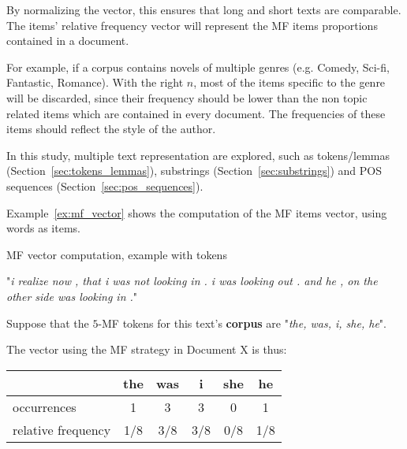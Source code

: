 By normalizing the vector, this ensures that long and short texts are comparable.
The items' relative frequency vector will represent the MF items proportions contained in a document.

For example, if a corpus contains novels of multiple genres (e.g. Comedy, Sci-fi, Fantastic, Romance).
With the right $n$, most of the items specific to the genre will be discarded, since their frequency should be lower than the non topic related items which are contained in every document.
The frequencies of these items should reflect the style of the author.

In this study, multiple text representation are explored, such as tokens/lemmas (Section~\ref{sec:tokens_lemmas}), substrings (Section~\ref{sec:substrings}) and POS sequences (Section~\ref{sec:pos_sequences}).

Example~\ref{ex:mf_vector} shows the computation of the MF items vector, using words as items.

\begin{example}
  \centering
  \caption{MF vector computation, example with tokens}
  \label{ex:mf_vector}

  \begin{subexample}{\linewidth}
    "\textit{i realize now , that i was not looking in . i was looking out . and he , on the other side was looking in .}"\cite{ddlc}
  \end{subexample}

  \vspace{0.5cm}

  \begin{subexample}{\linewidth}
    Suppose that the $5$-MF tokens for this text's \textbf{corpus} are "\textit{the, was, i, she, he}".

    The vector using the MF strategy in Document X is thus:
    \vspace{0.2cm}

    \centering
    \begin{tabular}{l c c c c c}
      \toprule
                         & the & was & i   & she & he  \\
      \midrule
      occurrences        & 1   & 3   & 3   & 0   & 1   \\
      relative frequency & 1/8 & 3/8 & 3/8 & 0/8 & 1/8 \\
      \bottomrule
    \end{tabular}
  \end{subexample}
\end{example}

